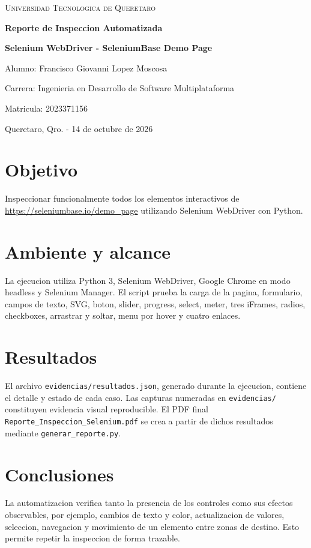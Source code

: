 \documentclass[12pt,a4paper]{report}
\begin{document}
\begin{titlepage}\centering
{\scshape\LARGE Universidad Tecnologica de Queretaro\par}\vspace{2cm}
{\huge\bfseries Reporte de Inspeccion Automatizada\par}\vspace{0.8cm}
{\LARGE\bfseries Selenium WebDriver - SeleniumBase Demo Page\par}\vspace{2cm}
{\Large Alumno: Francisco Giovanni Lopez Moscosa\par}
{\Large Carrera: Ingenieria en Desarrollo de Software Multiplataforma\par}
{\Large Matricula: 2023371156\par}\vfill
{\Large Queretaro, Qro. - 14 de octubre de 2026\par}
\end{titlepage}
\tableofcontents\newpage
\chapter{Objetivo}
Inspeccionar funcionalmente todos los elementos interactivos de \url{https://seleniumbase.io/demo_page} utilizando Selenium WebDriver con Python.
\chapter{Ambiente y alcance}
La ejecucion utiliza Python 3, Selenium WebDriver, Google Chrome en modo headless y Selenium Manager. El script prueba la carga de la pagina, formulario, campos de texto, SVG, boton, slider, progress, select, meter, tres iFrames, radios, checkboxes, arrastrar y soltar, menu por hover y cuatro enlaces.
\chapter{Resultados}
El archivo \texttt{evidencias/resultados.json}, generado durante la ejecucion, contiene el detalle y estado de cada caso. Las capturas numeradas en \texttt{evidencias/} constituyen evidencia visual reproducible. El PDF final \texttt{Reporte\_Inspeccion\_Selenium.pdf} se crea a partir de dichos resultados mediante \texttt{generar\_reporte.py}.
\chapter{Conclusiones}
La automatizacion verifica tanto la presencia de los controles como sus efectos observables, por ejemplo, cambios de texto y color, actualizacion de valores, seleccion, navegacion y movimiento de un elemento entre zonas de destino. Esto permite repetir la inspeccion de forma trazable.
\end{document}
